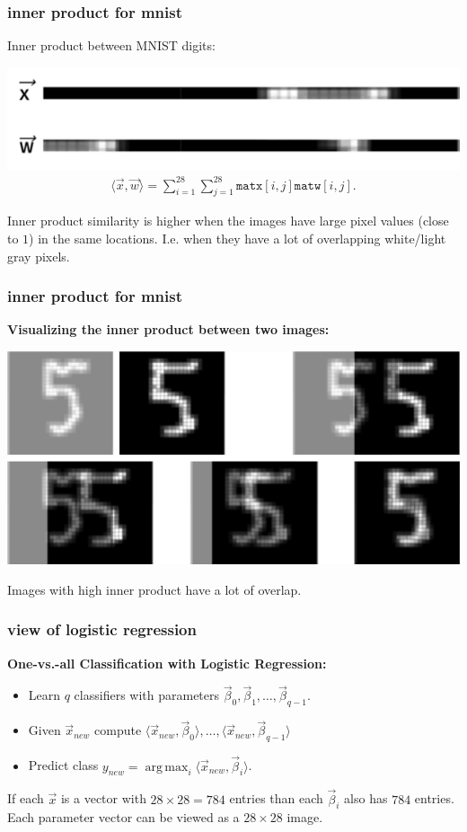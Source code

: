 \documentclass[handout,compress]{beamer}
\DeclareMathOperator*{\argmax}{arg\,max}
\begin{document}
\begin{frame}
	\frametitle{inner product for mnist}
	Inner product between MNIST digits:
	\begin{center}
			\includegraphics[width=.8\textwidth]{flat_compare.png}
	\begin{align*}
	\langle \vec{x},\vec{w}\rangle = \sum_{i=1}^{28} \sum_{j=1}^{28} \texttt{matx}[i,j]\texttt{matw}[i,j].
	\end{align*}
	\end{center}
	Inner product similarity is higher when the images have large pixel values (close to $1$) in the same locations. I.e. when they have a lot of overlapping white/light gray pixels.
\end{frame}

\begin{frame}
	\frametitle{inner product for mnist}
	\textbf{Visualizing the inner product between two images:}
		\begin{center}
			\includegraphics[width=.8\textwidth]{innerproduct_visualizatoin.png}
		\end{center}
	Images with high inner product have a lot of overlap.
\end{frame}

\begin{frame}
	\frametitle{view of logistic regression}
	\textbf{One-vs.-all Classification with Logistic Regression:}
	\begin{itemize}
		\item Learn $q$ classifiers with parameters $\vec{\beta}_0, \vec{\beta}_1, \ldots, \vec{\beta}_{q-1}$.
		\item Given $\vec{x}_{new}$ compute $\langle \vec{x}_{new}, \vec{\beta}_0\rangle, \ldots, \langle\vec{x}_{new}, \vec{\beta}_{q-1}\rangle$
		\item Predict class $y_{new} = \argmax_i \langle\vec{x}_{new}, \vec{\beta}_i\rangle$.
	\end{itemize}
	If each $\vec{x}$ is a vector with $28\times 28 = 784$ entries than each $\vec{\beta}_i$ also has $784$ entries. Each parameter vector can be viewed as a $28\times 28$ image. 
\end{frame}
\end{document}
